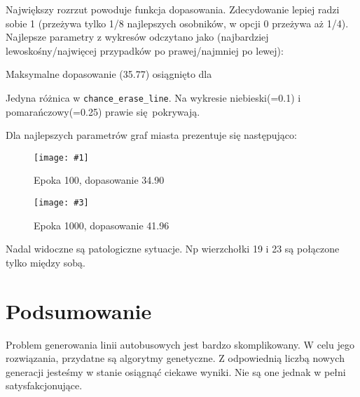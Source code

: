 \documentclass[12pt,a4paper,openright]{mwrep}
\newcommand{\imgsidebyside}[4]{
	\begin{figure}[H]
		\centering
		\begin{minipage}{.45\textwidth}
			\centering
			\texttt{[image: \#1]}
			\caption{#2}
		\end{minipage}%
		\hfill
		\begin{minipage}{.45\textwidth}
			\centering
			\texttt{[image: \#3]}
			\caption{#4}
		\end{minipage}
	\end{figure}
}
\begin{document}
Największy rozrzut powoduje funkcja dopasowania. Zdecydowanie lepiej radzi sobie 1 (przeżywa tylko 1/8 najlepszych osobników, w opcji 0 przeżywa aż 1/4). Najlepsze parametry z wykresów odczytano jako (najbardziej lewoskośny/najwięcej przypadków po prawej/najmniej po lewej):


Maksymalne dopasowanie (35.77) osiągnięto dla


Jedyna różnica w \lstinline|chance_erase_line|. Na wykresie niebieski(=0.1) i pomarańczowy(=0.25) prawie się pokrywają.

Dla najlepszych parametrów graf miasta prezentuje się następująco:
\imgsidebyside{best_params_hp3}{Epoka 100, dopasowanie 34.90}{best_params_hp3_1000}{Epoka 1000, dopasowanie 41.96}

Nadal widoczne są patologiczne sytuacje. Np wierzchołki 19 i 23 są połączone tylko między sobą.

\chapter{Podsumowanie}

Problem generowania linii autobusowych jest bardzo skomplikowany. W celu jego rozwiązania, przydatne są algorytmy genetyczne. Z odpowiednią liczbą nowych generacji jesteśmy w stanie osiągnąć ciekawe wyniki. Nie są one jednak w pełni satysfakcjonujące.
\end{document}
